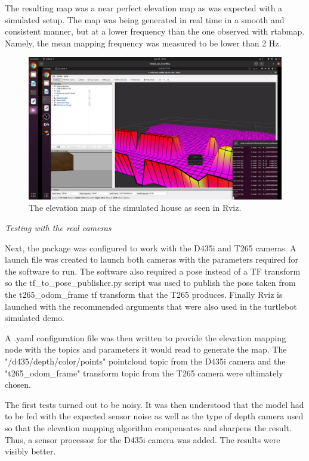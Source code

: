 \documentclass{article}
\begin{document}
The resulting map was a near perfect elevation map as was expected with a simulated setup. The map was being generated in real time in a smooth and consistent manner, but at a lower frequency than the one observed with rtabmap. Namely, the mean mapping frequency was measured to be lower than 2 Hz. 

\begin{figure}[h] %
    \centering
	\includegraphics[width=\textwidth,height=\textheight,keepaspectratio]{report1-img016.png} %
	\caption{The elevation map of the simulated house as seen in Rviz. }
\end{figure}

\bigskip
\clearpage

\textit{Testing with the real cameras}

\bigskip

Next, the package was configured to work with the D435i and T265 cameras. A launch file was created to launch both cameras with the parameters required for the software to run. The software also required a pose instead of a TF transform so the tf\_to\_pose\_publisher.py script was used to publish the pose taken from the t265\_odom\_frame tf transform that the T265 produces. Finally Rviz is launched with the recommended arguments that were also used in the turtlebot simulated demo.

A .yaml configuration file was then written to provide the elevation mapping node with the topics and parameters it would read to generate the map. The "/d435/depth/color/points" pointcloud topic from the D435i camera and the "t265\_odom\_frame" transform topic from the T265 camera were ultimately chosen.

The first tests turned out to be noisy. It was then understood that the model had to be fed with the expected sensor noise as well as the type of depth camera used so that the elevation mapping algorithm compensates and sharpens the result. Thus, a sensor processor for the D435i camera was added. The results were visibly better.
\end{document}
